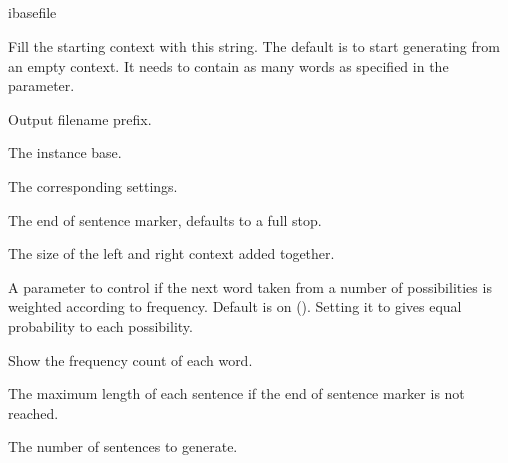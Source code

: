 \documentclass[a4paper,10pt,twoside]{report}
\begin{document}
\subsection{}

\begin{varlist}{ibasefile}
\item[start] Fill the starting context with this string. The default
  is to start generating from an empty context. It needs to contain as
  many words as specified in the  parameter.
\item[filename] Output filename prefix.
\item[ibasefile] The instance base.
\item[timbl] The corresponding \Timbl{} settings.
\item[end] The end of sentence marker, defaults to a full stop.
\item[ws] The size of the left and right context added together.
\item[mode] A parameter to control if the next word taken from a
  number of possibilities is weighted according to frequency. Default
  is on (). Setting it to  gives equal probability to
  each possibility.
\item[sc] Show the frequency count of each word.
\item[len] The maximum length of each sentence if the end of sentence
  marker is not reached.
\item[n] The number of sentences to generate.
\end{varlist}



\end{document}
